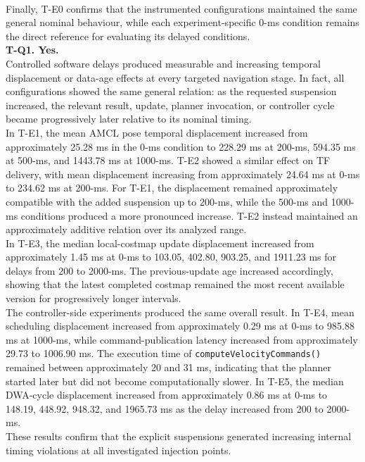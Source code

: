 \\ 
Finally, T-E0 confirms that the instrumented configurations maintained the same general nominal behaviour, while each experiment-specific 0-ms condition remains the direct reference for evaluating its delayed conditions.
\\
\noindent \textbf{T-Q1. Yes.}
\\
Controlled software delays produced measurable and increasing temporal displacement or data-age effects at every targeted navigation stage. In fact, all configurations showed the same general relation: as the requested suspension increased, the relevant result, update, planner invocation, or controller cycle became progressively later relative to its nominal timing.
\\
In T-E1, the mean AMCL pose temporal displacement increased from approximately 25.28 ms in the 0-ms condition to 228.29 ms at 200-ms, 594.35 ms at 500-ms, and 1443.78 ms at 1000-ms. T-E2 showed a similar effect on TF delivery, with mean displacement increasing from approximately 24.64 ms at 0-ms to 234.62 ms at 200-ms. For T-E1, the displacement remained approximately compatible with the added suspension up to 200-ms, while the 500-ms and 1000-ms conditions produced a more pronounced increase. T-E2 instead maintained an approximately additive relation over its analyzed range.
\\
In T-E3, the median local-costmap update displacement increased from approximately 1.45 ms at 0-ms to 103.05, 402.80, 903.25, and 1911.23 ms for delays from 200 to 2000-ms. The previous-update age increased accordingly, showing that the latest completed costmap remained the most recent available version for progressively longer intervals.
\\
The controller-side experiments produced the same overall result. In T-E4, mean scheduling displacement increased from approximately 0.29 ms at 0-ms to 985.88 ms at 1000-ms, while command-publication latency increased from approximately 29.73 to 1006.90 ms. The execution time of \texttt{computeVelocityCommands()} remained between approximately 20 and 31 ms, indicating that the planner started later but did not become computationally slower. In T-E5, the median DWA-cycle displacement increased from approximately 0.86 ms at 0-ms to 148.19, 448.92, 948.32, and 1965.73 ms as the delay increased from 200 to 2000-ms.
\\
These results confirm that the explicit suspensions generated increasing internal timing violations at all investigated injection points.
